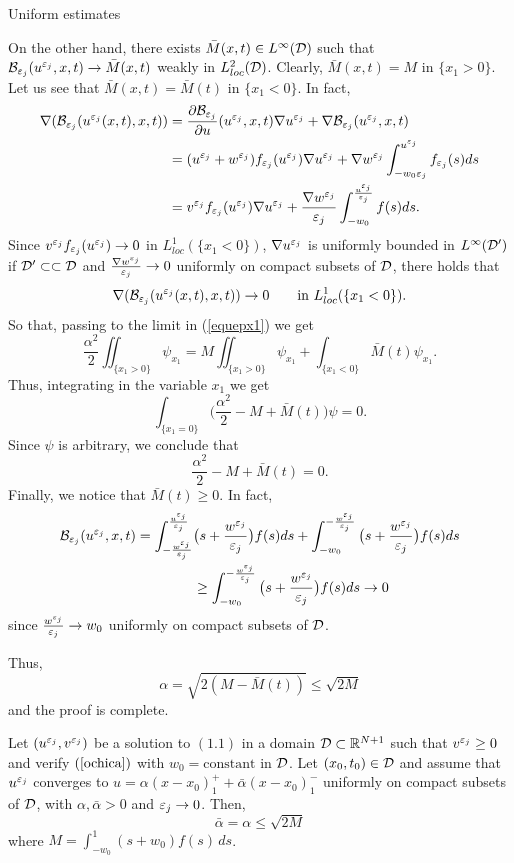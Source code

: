 \begin{section}{Uniform estimates}
\begin{pf}
On the other hand, there exists $\bar M(x,t)\in L^\infty({\cal D})$ such that
${\cal B}_{{\varepsilon_j}}(u^{\varepsilon_j},x,t)\to \bar M(x,t)$ weakly in $L^2_{loc}({\cal D})$. Clearly,
$\bar M(x,t)=M$ in $\{x_1>0\}$. Let us see that
$\bar M(x,t)=\bar M(t)$ in $\{x_1<0\}$. In fact,
\begin{align*}
\nabla({\cal B}_{{\varepsilon_j}}(u^{\varepsilon_j}(x,t),x,t))&=\frac{\partial{\cal B}_{{\varepsilon_j}}}{\partial u}(u^{\varepsilon_j},x,t)
\nabla u^{\varepsilon_j}+\nabla{\cal B}_{{\varepsilon_j}}(u^{\varepsilon_j},x,t)\\
&=(u^{\varepsilon_j}+w^{\varepsilon_j})f_{{\varepsilon_j}}(u^{\varepsilon_j})\nabla u^{\varepsilon_j}+\nabla w^{\varepsilon_j}\int_{-w_0{\varepsilon_j}}^{u^{\varepsilon_j}}
f_{{\varepsilon_j}}(s)ds\\
&= v^{\varepsilon_j} f_{{\varepsilon_j}}(u^{\varepsilon_j})\nabla u^{\varepsilon_j}+ \frac{\nabla w^{\varepsilon_j}}{{\varepsilon_j}}\int_{-w_0}
^{\frac{u^{\varepsilon_j}}{{\varepsilon_j}}}f(s)ds.
\end{align*}
Since $v^{\varepsilon_j} f_{{\varepsilon_j}}(u^{\varepsilon_j})\to 0$ in $L^1_{loc}(\{x_1<0\})$, $\nabla u^{\varepsilon_j}$
is uniformly bounded in $L^\infty({\cal D}')$ if ${\cal D}'\subset\subset{\cal D}$ and
$\frac{\nabla w^{\varepsilon_j}}{{\varepsilon_j}}\to 0$ uniformly on compact subsets of ${\cal D}$, there
holds that
$$
\nabla({\cal B}_{{\varepsilon_j}}(u^{\varepsilon_j}(x,t),x,t))\to 0\qquad\mbox{in }L^1_{loc}(\{x_1<0\}).
$$
So that, passing to the limit in (\ref{equepx1}) we get
$$
\frac{\alpha^2}2\iint_{\{x_1>0\}}\psi_{x_1}=M\iint_{\{x_1>0\}}\psi_{x_1}+
\int_{\{x_1<0\}}\bar M(t)\psi_{x_1}.
$$
Thus, integrating in the variable $x_1$ we get
$$
\int_{\{x_1=0\}}\big(\frac{\alpha^2}2-M+\bar M(t)\big)\psi=0.
$$
Since $\psi$ is arbitrary, we conclude that
$$
\frac{\alpha^2}2-M+\bar M(t)=0.
$$
Finally, we notice that $\bar M(t)\ge0$. In fact,
\begin{align*}
{\cal B}_{{\varepsilon_j}}(u^{\varepsilon_j},x,t)=\int_{-\frac{w^{\varepsilon_j}}{{\varepsilon_j}}}^{\frac{u^{\varepsilon_j}}{{\varepsilon_j}}}&\big(s+\frac{w^{\varepsilon_j}}
{{\varepsilon_j}}\big)f(s)ds +\int_{-w_0}^{-\frac{w^{\varepsilon_j}}{{\varepsilon_j}}}\big(s+\frac{w^{\varepsilon_j}}{{\varepsilon_j}}\big)
f(s)ds\\
&\ge\int_{-w_0}^{-\frac{w^{\varepsilon_j}}{{\varepsilon_j}}}\big(s+\frac{w^{\varepsilon_j}}{{\varepsilon_j}}\big) f(s)ds\to0
\end{align*}
since  $ \frac{w^{\varepsilon_j}}{{\varepsilon_j}}\to w_0$ uniformly on compact subsets of ${\cal D}$.

            Thus,
            $$
            \alpha=\sqrt{2(M-\bar M(t))}\le\sqrt{2M}
            $$
            and the proof is complete.\end{pf}


\begin{lema}
\label{global2}
Let $(u^{\varepsilon_j},v^{\varepsilon_j})$ be a solution to $(1.1)$ in a domain ${\cal D}\subset{\Bbb R}^{N+1}$
such that $v^{\varepsilon_j}\ge0$ and verify $(\ref{ochica})$ with $w_0=\mbox{constant}$
in ${\cal D}$.
Let $(x_0,t_0)\in{\cal D}$ and assume that $u^{\varepsilon_j}$ converges
to $u=\alpha(x-x_0)_1^++\bar\alpha(x-x_0)_1^-$ uniformly on compact subsets of 
${\cal D}$, with $\alpha,\bar\alpha>0$ and ${\varepsilon_j}\to0$. Then,
\begin{equation}
\bar\alpha=\alpha\le\sqrt{2M}
\end{equation}
where $M=\int_{-w_0}^1 (s+w_0)f(s)\,ds$.
\end{lema}



\end{section}
